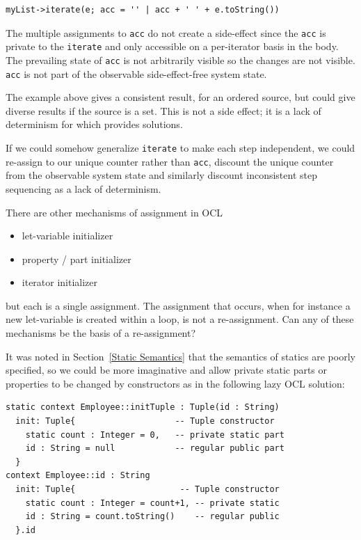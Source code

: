 \documentclass[sigconf]{acmart}
\begin{document}
\begin{verbatim}
myList->iterate(e; acc = '' | acc + ' ' + e.toString())
\end{verbatim} 

The multiple assignments to \verb|acc| do not create a side-effect since the \verb|acc| is private to the \verb|iterate| and only accessible on a per-iterator basis in the body. The prevailing state of \verb|acc| is not arbitrarily visible so the changes are not visible. \verb|acc| is not part of the observable side-effect-free system state.

The example above gives a consistent result, for an ordered source, but could give diverse results if the source is a set. This is not a side effect; it is a lack of determinism for which \cite{Willink2018} provides solutions.

If we could somehow generalize \verb|iterate| to make each step independent, we could re-assign to our unique counter rather than \verb|acc|, discount the unique counter from the observable system state and similarly discount inconsistent step sequencing as a lack of determinism.

There are other mechanisms of assignment in OCL
\begin{itemize}
	\item let-variable initializer
	\item property / part initializer
	\item iterator initializer
\end{itemize}
but each is a single assignment. The assignment that occurs, when for instance a new let-variable is created within a loop, is not a re-assignment. Can any of these mechanisms be the basis of a re-assignment?

It was noted in Section~\ref{Static Semantics} that the semantics of statics are poorly specified, so we could be more imaginative and allow private static parts or properties to be changed by constructors as in the following lazy OCL solution:

\begin{verbatim}
static context Employee::initTuple : Tuple(id : String) 
  init: Tuple{                    -- Tuple constructor
    static count : Integer = 0,   -- private static part
    id : String = null            -- regular public part
  }
context Employee::id : String
  init: Tuple{                     -- Tuple constructor
    static count : Integer = count+1, -- private static
    id : String = count.toString()    -- regular public
  }.id
\end{verbatim} 
\end{document}

